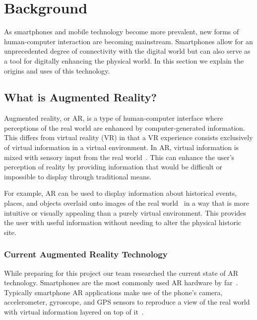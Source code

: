\documentclass[a4paper, 10pt, american, titlepage]{article}
\begin{document}
\clearpage

\section{Background}
\label{sec:background}

As smartphones and mobile technology become more prevalent, new forms of
human-computer interaction are becoming mainstream. Smartphones allow for an
unprecedented degree of connectivity with the digital world but can also serve
as a tool for digitally enhancing the physical world. In this section we explain
the origins and uses of this technology.

\subsection{What is Augmented Reality?}
\label{sec:whatIsAugmentedReality}

Augmented reality, or AR, is a type of human-computer interface where
perceptions of the real world are enhanced by computer-generated information.
This differs from virtual reality (VR) in that a VR experience consists
exclusively of virtual information in a virtual environment. In AR, virtual
information is mixed with sensory input from the real
world~\autocite{carmigniani2011}. This can enhance the user's perception of
reality by providing information that would be difficult or impossible to
display through traditional means.

For example, AR can be used to display information about historical events,
places, and objects overlaid onto images of the real
world~\autocite{saenz2009} in a way that is more intuitive or visually
appealing than a purely virtual environment. This provides the user with useful
information without needing to alter the physical historic site.

\subsubsection{Current Augmented Reality Technology}
\label{sec:currentAugmentedRealityTechnology}

While preparing for this project our team researched the current state of AR
technology. Smartphones are the most commonly used AR hardware by
far~\autocite{boland2018}. Typically smartphone AR applications make use of the
phone's camera, accelerometer, gyroscope, and GPS sensors to reproduce a view
of the real world with virtual information layered on top of
it~\autocite{bonsor2018}.
\end{document}
